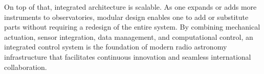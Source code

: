    On top of that, integrated architecture is scalable. As one expands or adds more instruments to observatories, modular design enables one to add or substitute parts without requiring a redesign of the entire system. By combining mechanical actuation, sensor integration, data management, and computational control, an integrated control system is the foundation of modern radio astronomy infrastructure that facilitates continuous innovation and seamless international collaboration.